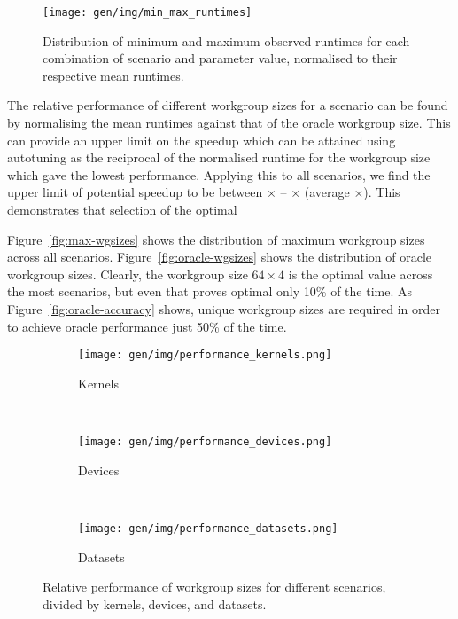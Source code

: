 \begin{figure}
\centering
\texttt{[image: gen/img/min\_max\_runtimes]}
\caption{%
  Distribution of minimum and maximum observed runtimes for each
  combination of scenario and parameter value, normalised to their
  respective mean runtimes.%
}
\label{fig:min-max-runtimes}
\end{figure}

The relative performance of different workgroup sizes for a scenario
can be found by normalising the mean runtimes against that of the
oracle workgroup size. This can provide an upper limit on the speedup
which can be attained using autotuning as the reciprocal of the
normalised runtime for the workgroup size which gave the lowest
performance. Applying this to all scenarios, we find the upper limit
of potential speedup to be between
$\times$ --
$\times$ (average
$\times$). This demonstrates that
selection of the optimal

Figure~\ref{fig:max-wgsizes} shows the distribution of maximum
workgroup sizes across all scenarios. Figure~\ref{fig:oracle-wgsizes}
shows the distribution of oracle workgroup sizes. Clearly, the
workgroup size $64 \times 4$ is the optimal value across the most
scenarios, but even that proves optimal only 10\% of the time. As
Figure~\ref{fig:oracle-accuracy} shows,
 unique workgroup sizes are
required in order to achieve oracle performance just 50\% of the time.


\begin{figure}
\begin{subfigure}[t]{0.32\textwidth}
\centering
\texttt{[image: gen/img/performance\_kernels.png]}
\vspace{-1.5em} %
\caption{Kernels}
\label{fig:performance-kernels}
\end{subfigure}
~%
\begin{subfigure}[t]{0.32\textwidth}
\centering
\texttt{[image: gen/img/performance\_devices.png]}
\vspace{-1.5em} %
\caption{Devices}
\label{fig:performance-devices}
\end{subfigure}
~%
\begin{subfigure}[t]{0.32\textwidth}
\centering
\texttt{[image: gen/img/performance\_datasets.png]}
\vspace{-1.5em} %
\caption{Datasets}
\label{fig:performance-datasets}
\end{subfigure}
\label{fig:performance}
\caption{%
  Relative performance of workgroup sizes for different
  scenarios, divided by kernels, devices, and datasets.%
}
\end{figure}

